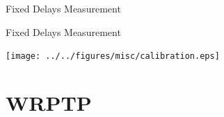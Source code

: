 \documentclass[compress,red]{beamer}
\begin{document}
\logo{}
\begin{frame}{Fixed Delays Measurement}


\end{frame}
\begin{frame}{Fixed Delays Measurement}

  \begin{center}
  \texttt{[image: ../../figures/misc/calibration.eps]}
  \end{center}

\end{frame}
% 
% 
% 
\section{WRPTP}
\end{document}
